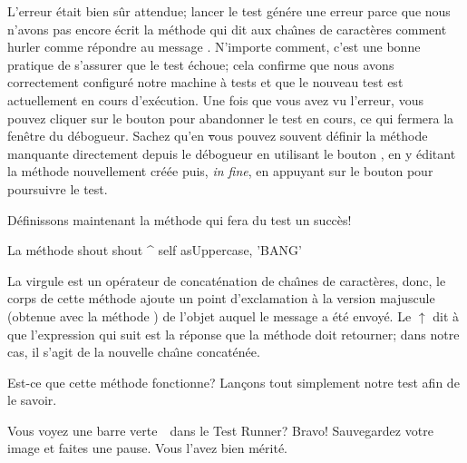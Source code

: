\documentclass[a4paper,10pt,twoside]{book}
\begin{document}
L'erreur \'etait bien s\^ur attendue; lancer le test g\'en\'ere une
erreur parce que nous n'avons pas encore \'ecrit la m\'ethode qui dit
aux cha\^{\i}nes de caract\`eres comment hurler 
\cad comme r\'epondre au message .
N'importe comment, c'est une bonne pratique de s'assurer que le test
\'echoue; cela confirme que nous avons correctement
configur\'e notre machine \`a tests %
et que le nouveau test est actuellement en cours d'ex\'ecution.
Une fois que vous avez vu l'erreur, vous pouvez cliquer sur le bouton
 pour abandonner le test en cours, ce qui fermera la
fen\^etre du d\'ebogueur.
Sachez qu'en \st vous pouvez souvent d\'efinir la m\'ethode manquante
directement depuis le d\'ebogueur 
en utilisant le bouton , en y \'editant la m\'ethode
nouvellement cr\'e\'ee puis, \emph{in fine}, en appuyant sur le bouton
 pour poursuivre le test.

D\'efinissons maintenant la m\'ethode qui fera du test un succ\`es!

\begin{method}[shout]{La m\'ethode shout}
shout
	^ self asUppercase, 'BANG'
\end{method}

La virgule est un op\'erateur de concat\'enation de cha\^{\i}nes de
caract\`eres, donc, le corps de cette m\'ethode ajoute un point
d'exclamation \`a la version majuscule
(obtenue avec la m\'ethode )
de l'objet  auquel le message  a \'et\'e
envoy\'e.
Le $\uparrow$ dit \`a \sq que l'expression qui suit est la r\'eponse
que la m\'ethode doit retourner; dans notre cas, il s'agit de la
nouvelle cha\^{\i}ne concat\'en\'ee.

Est-ce que cette m\'ethode fonctionne? Lan\c{c}ons tout simplement
notre test afin de le savoir.

Vous voyez une barre verte~\footnotemark\ dans le Test Runner? Bravo!
Sauvegardez votre image et faites une pause. 
Vous l'avez bien m\'erit\'e. 
\end{document}
